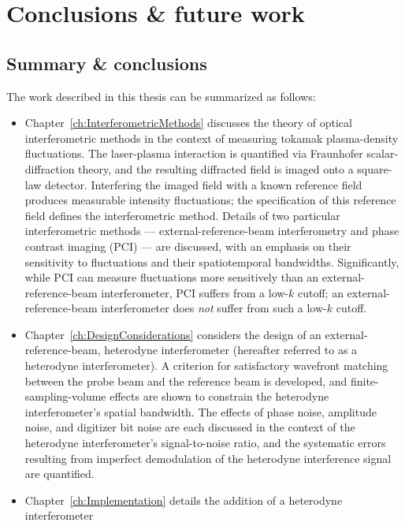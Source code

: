 \chapter{Conclusions \& future work}
\label{ch:Conclusions}


\section{Summary \& conclusions}
\label{sec:Conclusions:summary_and_conclusions}
The work described in this thesis can be summarized as follows:
\begin{itemize}
  \item Chapter~\ref{ch:InterferometricMethods} discusses
    the theory of optical interferometric methods
    in the context of measuring tokamak plasma-density fluctuations.
    The laser-plasma interaction is quantified via
    Fraunhofer scalar-diffraction theory, and
    the resulting diffracted field is imaged onto a square-law detector.
    Interfering the imaged field with a known reference field
    produces measurable intensity fluctuations;
    the specification of this reference field
    defines the interferometric method.
    Details of two particular interferometric methods ---
    external-reference-beam interferometry and
    phase contrast imaging (PCI) ---
    are discussed, with an emphasis on
    their sensitivity to fluctuations and their spatiotemporal bandwidths.
    Significantly, while PCI can measure fluctuations more sensitively
    than an external-reference-beam interferometer,
    PCI suffers from a low-$k$ cutoff;
    an external-reference-beam interferometer
    does \emph{not} suffer from such a low-$k$ cutoff.
  \item Chapter~\ref{ch:DesignConsiderations} considers the design of an
    external-reference-beam, heterodyne interferometer
    (hereafter referred to as a heterodyne interferometer).
    A criterion for satisfactory wavefront matching
    between the probe beam and the reference beam is developed, and
    finite-sampling-volume effects are shown
    to constrain the heterodyne interferometer's spatial bandwidth.
    The effects of phase noise, amplitude noise, and digitizer bit noise
    are each discussed in the context of
    the heterodyne interferometer's signal-to-noise ratio, and
    the systematic errors resulting from
    imperfect demodulation of the heterodyne interference signal
    are quantified.
  \item Chapter~\ref{ch:Implementation} details
    the addition of a heterodyne interferometer

\end{itemize}
